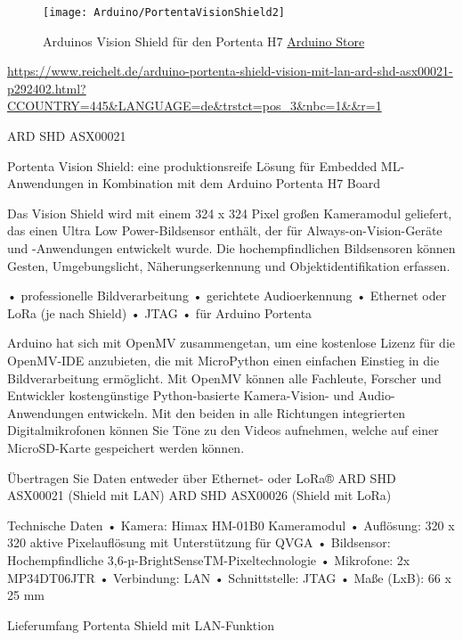 \begin{figure}
	\centering
	\texttt{[image: Arduino/PortentaVisionShield2]}
	\caption{Arduinos Vision Shield für den Portenta H7 \href{https://store.arduino.cc/portenta-h7}{Arduino Store}}
\end{figure}

\url{https://www.reichelt.de/arduino-portenta-shield-vision-mit-lan-ard-shd-asx00021-p292402.html?CCOUNTRY=445&LANGUAGE=de&trstct=pos_3&nbc=1&&r=1}


ARD SHD ASX00021

Portenta Vision Shield: eine produktionsreife Lösung für Embedded ML-Anwendungen in Kombination mit dem Arduino Portenta H7 Board

Das Vision Shield wird mit einem 324 x 324 Pixel großen Kameramodul geliefert, das einen Ultra Low Power-Bildsensor enthält, der für Always-on-Vision-Geräte und -Anwendungen entwickelt wurde. Die hochempfindlichen Bildsensoren können Gesten, Umgebungslicht, Näherungserkennung und Objektidentifikation erfassen.

• professionelle Bildverarbeitung
• gerichtete Audioerkennung
• Ethernet oder LoRa (je nach Shield)
• JTAG
• für Arduino Portenta

Arduino hat sich mit OpenMV zusammengetan, um eine kostenlose Lizenz für die OpenMV-IDE anzubieten, die mit MicroPython einen einfachen Einstieg in die Bildverarbeitung ermöglicht. Mit OpenMV können alle Fachleute, Forscher und Entwickler kostengünstige Python-basierte Kamera-Vision- und Audio-Anwendungen entwickeln. Mit den beiden in alle Richtungen integrierten Digitalmikrofonen können Sie Töne zu den Videos aufnehmen, welche auf einer MicroSD-Karte gespeichert werden können.

Übertragen Sie Daten entweder über Ethernet- oder LoRa®
ARD SHD ASX00021 (Shield mit LAN)
ARD SHD ASX00026 (Shield mit LoRa)

Technische Daten
• Kamera: Himax HM-01B0 Kameramodul
• Auflösung: 320 x 320 aktive Pixelauflösung mit Unterstützung für QVGA
• Bildsensor: Hochempfindliche 3,6-µ-BrightSenseTM-Pixeltechnologie
• Mikrofone: 2x MP34DT06JTR
• Verbindung: LAN
• Schnittstelle: JTAG
• Maße (LxB): 66 x 25 mm

Lieferumfang
Portenta Shield mit LAN-Funktion
